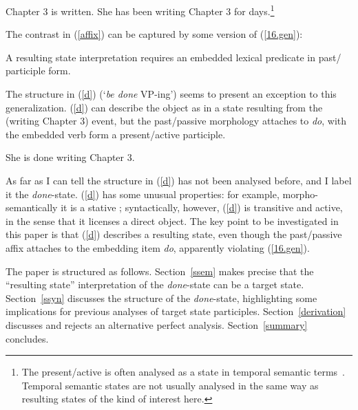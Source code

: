 \documentclass[output=paper,modfonts,nonflat]{langsci/langscibook}
\begin{document}
\begin{exe}
\ex\label{affix}
    \begin{xlist}
    \ex Chapter 3 is written.
    \ex She has been writing Chapter 3 for days.\footnote{The present/active is often analysed as a state in temporal semantic terms~\citep[e.g.\ ][]{Parsons1990a}. Temporal semantic states are not usually analysed in the same way as resulting states of the kind of interest here.}
    \end{xlist}
\end{exe}

The contrast in (\ref{affix}) can be captured by some version of (\ref{16.gen}):

\begin{exe}
\ex\label{16.gen}  A resulting state interpretation requires an embedded lexical predicate in past\slash{} participle form.
\end{exe}

The structure in (\ref{d}) (`\emph{be done} VP-ing') seems to present an
exception to this generalization. (\ref{d}) can describe the object as in a
state resulting from the (writing Chapter 3) event, but the past\slash passive
morphology attaches to \emph{do}, with the embedded verb form a present\slash active
participle.

\begin{exe}
\ex\label{d} She is done writing Chapter 3.
\end{exe}

As far as I can tell the structure in (\ref{d})  has not been analysed before,
and I label it the \emph{done}-state. (\ref{d}) has some unusual properties:
for example, morpho-semantically it is a stative ; syntactically,
however, (\ref{d}) is transitive and active, in the sense that it licenses a
direct object. The key point to be investigated in this paper is that (\ref{d})
describes a resulting state, even though the past/passive affix attaches to the
embedding item \emph{do}, apparently violating (\ref{16.gen}).

The paper is structured as follows. Section~\ref{ssem} makes precise that the
\enquote{resulting state} interpretation of the \emph{done}-state can be a
target state. Section~\ref{ssyn} discusses the structure of the
\emph{done}-state, highlighting some implications for previous analyses of
target state participles. Section~\ref{derivation} discusses and rejects an
alternative perfect analysis. Section~\ref{summary} concludes.
\end{document}
